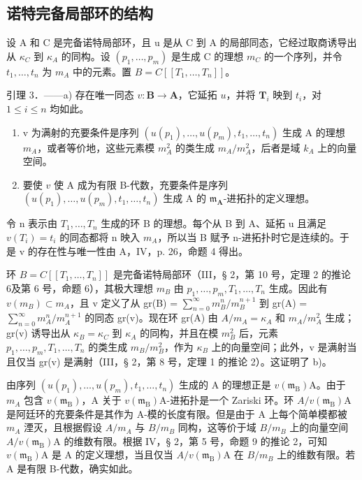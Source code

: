 \subsection{诺特完备局部环的结构}

设 A 和 C 是完备诺特局部环，且 u 是从 C 到 A 的局部同态，它经过取商诱导出从 \(\kappa_{C}\) 到 \(\kappa_{A}\) 的同构。设 \((p_{1}, \ldots, p_{m})\) 是生成 C 的理想 \(m_{C}\) 的一个序列，并令 \(t_{1}, \ldots, t_{n}\) 为 \(m_{A}\) 中的元素。置 \(B = C[[T_{1}, \ldots, T_{n}]]\)。

引理 3．——a) 存在唯一同态 \(v: \mathbf{B} \to \mathbf{A}\)，它延拓 \(u\)，并将 \(\mathbf{T}_i\) 映到 \(t_i\)，对 \(1 \leqslant i \leqslant n\) 均如此。

\begin{enumerate}
\def\labelenumi{\alph{enumi})}
\setcounter{enumi}{1}
\item
  v 为满射的充要条件是序列 \((u(p_{1}), \ldots, u(p_{m}), t_{1}, \ldots, t_{n})\) 生成 A 的理想 \(m_{A}\)，或者等价地，这些元素模 \(m_{A}^{2}\) 的类生成 \(m_{A}/m_{A}^{2}\)，后者是域 \(k_{A}\) 上的向量空间。
\item
  要使 \(v\) 使 A 成为有限 B-代数，充要条件是序列 \((u(p_1), \ldots, u(p_m), t_1, \ldots, t_n)\) 生成 A 的 \(\mathfrak{m}_{\mathbf{A}}\)-进拓扑的定义理想。
\end{enumerate}

令 n 表示由 \(T_{1}, \ldots, T_{n}\) 生成的环 B 的理想。每个从 B 到 A、延拓 u 且满足 \(v(T_{i}) = t_{i}\) 的同态都将 n 映入 \(m_{A}\)，所以当 B 赋予 n-进拓扑时它是连续的。于是 v 的存在性与唯一性由 A，IV，p. 26，命题 4 得出。

环 \(B = C[[T_{1}, \ldots, T_{n}]]\) 是完备诺特局部环（III，§ 2，第 10 号，定理 2 的推论 6及第 6 号，命题 6），其极大理想 \(m_{B}\) 由 \(p_{1}, \ldots, p_{m}, T_{1}, \ldots, T_{n}\) 生成。因此有 \(v(m_{B}) \subset m_{A}\)，且 v 定义了从 gr(B) = \(\sum_{n=0}^{\infty} m_{B}^{n}/m_{B}^{n+1}\) 到 gr(A) = \(\sum_{n=0}^{\infty} m_{A}^{n}/m_{A}^{n+1}\) 的同态 gr(v)。现在环 gr(A) 由 \(A/m_{A} = \kappa_{A}\) 和 \(m_{A}/m_{A}^{2}\) 生成；gr(v) 诱导出从 \(\kappa_{B} = \kappa_{C}\) 到 \(\kappa_{A}\) 的同构，并且在模 \(m_{B}^{2}\) 后，元素 \(p_{1}, \ldots, p_{m}, T_{1}, \ldots, T_{n}\) 的类生成 \(m_{B}/m_{B}^{2}\)，作为 \(\kappa_{B}\) 上的向量空间；此外，v 是满射当且仅当 gr(v) 是满射（III，§ 2，第 8 号，定理 1 的推论 2）。这证明了 b)。

由序列 \((u(p_{1}), \ldots, u(p_{m}), t_{1}, \ldots, t_{n})\) 生成的 A 的理想正是 \(v(\mathfrak{m}_{\mathrm{B}})\)A。由于 \(m_{A}\) 包含 \(v(\mathfrak{m}_{\mathrm{B}})\)，A 关于 \(v(\mathfrak{m}_{\mathrm{B}})\)A-进拓扑是一个 Zariski 环。环 \(A/v(\mathfrak{m}_{\mathrm{B}})\)A 是阿廷环的充要条件是其作为 A-模的长度有限。但是由于 A 上每个简单模都被 \(m_{A}\) 湮灭，且根据假设 \(A/m_{A}\) 与 \(B/m_{B}\) 同构，这等价于域 \(B/m_{B}\) 上的向量空间 \(A/v(\mathfrak{m}_{\mathrm{B}})\)A 的维数有限。根据 IV，§ 2，第 5 号，命题 9 的推论 2，可知 \(v(\mathfrak{m}_{\mathrm{B}})\)A 是 A 的定义理想，当且仅当 \(A/v(\mathfrak{m}_{\mathrm{B}})\)A 在 \(B/m_{B}\) 上的维数有限。若 A 是有限 B-代数，确实如此。

